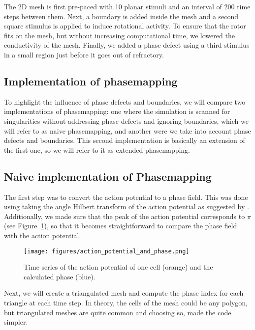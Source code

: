 \documentclass[twocolumn]{article}
\begin{document}
The 2D mesh is first pre-paced with 10 planar stimuli and an interval of
200 time steps between them. Next, a boundary is added inside the mesh
and a second square stimulus is applied to induce rotational activity.
To ensure that the rotor fits on the mesh, but without increasing
computational time, we lowered the conductivity of the mesh. Finally, we
added a phase defect using a third stimulus in a small region just
before it goes out of refractory.

\subsection{Implementation of phasemapping}

To highlight the influence of phase defects and boundaries, we will
compare two implementations of phasemapping: one where the simulation is
scanned for singularities without addressing phase defects and ignoring
boundaries, which we will refer to as naive phasemapping, and another
were we take into account phase defects and boundaries. This second
implementation is basically an extension of the first one, so we will
refer to it as extended phasemapping.

\subsection{Naive implementation of Phasemapping}

The first step was to convert the action potential to a phase field.
This was done using taking the angle Hilbert transform of the action
potential as suggested by \autocite{bray2002considerations}. Additionally,
we made sure that the peak of the action potential corresponds to
\(\pi\) (see Figure~\ref{fig:action_potential_and_phase}),
so that it becomes straightforward to compare the phase field with
the action potential.

\begin{figure}[ht]
  \begin{center}
    \texttt{[image: figures/action\_potential\_and\_phase.png]}
  \end{center}
  \caption{
    Time series of the action potential of one cell (orange)
    and the calculated phase (blue).
  }\label{fig:action_potential_and_phase}
\end{figure}

Next, we will create a triangulated mesh and compute the phase index for
each triangle at each time step. In theory, the cells of the mesh could
be any polygon, but triangulated meshes are quite common and choosing
so, made the code simpler.
\end{document}
